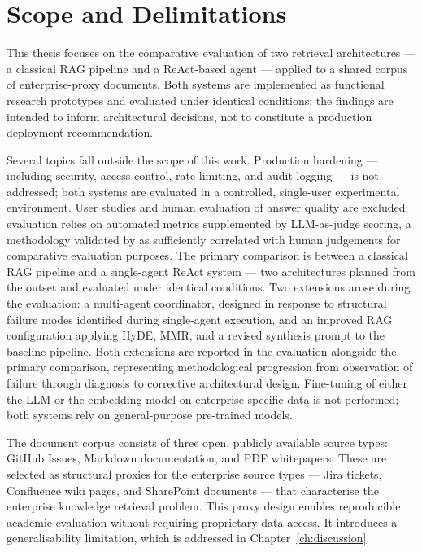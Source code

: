 \section{Scope and Delimitations}

This thesis focuses on the comparative evaluation of two retrieval architectures — a classical RAG pipeline and a ReAct-based agent — applied to a shared corpus of enterprise-proxy documents. Both systems are implemented as functional research prototypes and evaluated under identical conditions; the findings are intended to inform architectural decisions, not to constitute a production deployment recommendation.

Several topics fall outside the scope of this work. Production hardening — including security, access control, rate limiting, and audit logging — is not addressed; both systems are evaluated in a controlled, single-user experimental environment. User studies and human evaluation of answer quality are excluded; evaluation relies on automated metrics supplemented by LLM-as-judge scoring, a methodology validated by  as sufficiently correlated with human judgements for comparative evaluation purposes. The primary comparison is between a classical RAG pipeline and a single-agent ReAct system — two architectures planned from the outset and evaluated under identical conditions. Two extensions arose during the evaluation: a multi-agent coordinator, designed in response to structural failure modes identified during single-agent execution, and an improved RAG configuration applying HyDE, MMR, and a revised synthesis prompt to the baseline pipeline. Both extensions are reported in the evaluation alongside the primary comparison, representing methodological progression from observation of failure through diagnosis to corrective architectural design. Fine-tuning of either the LLM or the embedding model on enterprise-specific data is not performed; both systems rely on general-purpose pre-trained models.

The document corpus consists of three open, publicly available source types: GitHub Issues, Markdown documentation, and PDF whitepapers. These are selected as structural proxies for the enterprise source types — Jira tickets, Confluence wiki pages, and SharePoint documents — that characterise the enterprise knowledge retrieval problem. This proxy design enables reproducible academic evaluation without requiring proprietary data access. It introduces a generalisability limitation, which is addressed in Chapter~\ref{ch:discussion}.